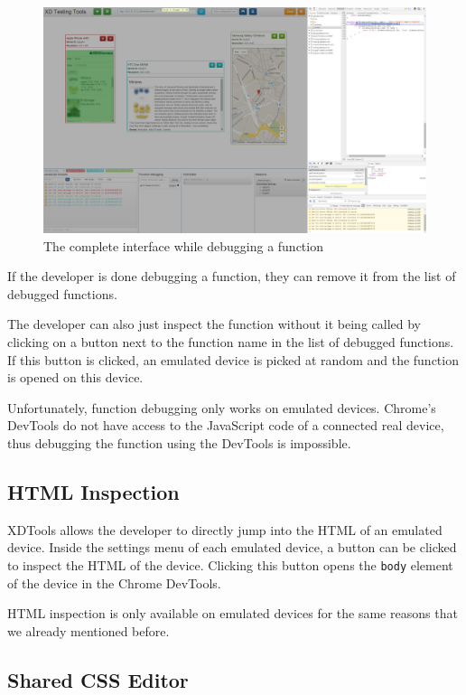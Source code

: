 \begin{figure}[H]
  \centering
    \includegraphics[width=1.0\textwidth]{images/screenshots/function_debugging_complete.png}
	\caption[Screenshot: Function debugging]{The complete interface while debugging a function}
	\label{fig:function_debugging_complete}
\end{figure}

If the developer is done debugging a function, they can remove it from the list of debugged functions.

The developer can also just inspect the function without it being called by clicking on a button next to the function name in the list of debugged functions. If this button is clicked, an emulated device is picked at random and the function is opened on this device. 

Unfortunately, function debugging only works on emulated devices. Chrome's DevTools do not have access to the JavaScript code of a connected real device, thus debugging the function using the DevTools is impossible.

\subsection{HTML Inspection}

XDTools allows the developer to directly jump into the HTML of an emulated device. Inside the settings menu of each emulated device, a button can be clicked to inspect the HTML of the device. Clicking this button opens the \lstinline|body| element of the device in the Chrome DevTools. 

HTML inspection is only available on emulated devices for the same reasons that we already mentioned before.

\subsection{Shared CSS Editor}

